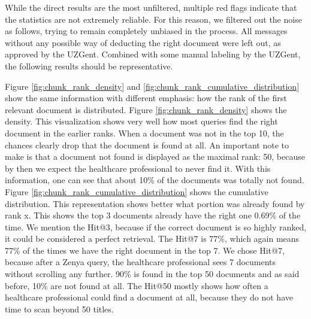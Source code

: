 While the direct results are the most unfiltered, multiple red flags indicate that the statistics are not extremely reliable. For this reason, we filtered out the noise as follows, trying to remain completely unbiased in the process. All messages without any possible way of deducting the right document were left out, as approved by the UZGent. Combined with some manual labeling by the UZGent, the following results should be representative.

Figure \ref{fig:chunk_rank_density} and \ref{fig:chunk_rank_cumulative_distribution} show the same information with different emphasis: how the rank of the first relevant document is distributed. Figure \ref{fig:chunk_rank_density} shows the density. This visualization shows very well how most queries find the right document in the earlier ranks. When a document was not in the top 10, the chances clearly drop that the document is found at all. An important note to make is that a document not found is displayed as the maximal rank: 50, because by then we expect the healthcare professional to never find it. With this information, one can see that about 10\% of the documents was totally not found. Figure \ref{fig:chunk_rank_cumulative_distribution} shows the cumulative distribution. This representation shows better what portion was already found by rank x. This shows the top 3 documents already have the right one 0.69\% of the time. We mention the Hit@3, because if the correct document is so highly ranked, it could be considered a perfect retrieval. The Hit@7 is 77\%, which again means 77\% of the times we have the right document in the top 7. We chose Hit@7, because after a Zenya query, the healthcare professional sees 7 documents without scrolling any further. 90\% is found in the top 50 documents and as said before, 10\% are not found at all. The Hit@50 mostly shows how often a healthcare professional could find a document at all, because they do not have time to scan beyond 50 titles.

